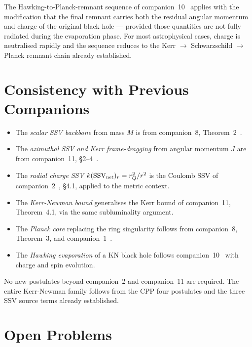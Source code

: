 \documentclass[12pt]{article}
\newcommand{\rQ}{r_Q}
\newcommand{\SSV}{\mathrm{SSV}}
\begin{document}
The Hawking-to-Planck-remnant sequence of companion~10~\cite{c10}
applies with the modification that the final remnant carries both the
residual angular momentum and charge of the original black hole —
provided those quantities are not fully radiated during the evaporation
phase.  For most astrophysical cases, charge is neutralised rapidly
and the sequence reduces to the Kerr $\to$ Schwarzschild $\to$ Planck
remnant chain already established.

\section{Consistency with Previous Companions}
\label{sec:consistency}

\begin{itemize}[noitemsep]
  \item The \emph{scalar SSV backbone} from mass $M$ is from companion~8,
    Theorem~2~\cite{c8}.
  \item The \emph{azimuthal SSV and Kerr frame-dragging} from angular
    momentum $J$ are from companion~11, §2--4~\cite{c11}.
  \item The \emph{radial charge SSV} $k(\SSV_{\rm net})_r = \rQ^2/r^2$
    is the Coulomb SSV of companion~2~\cite{c2}, §4.1, applied to the
    metric context.
  \item The \emph{Kerr-Newman bound} generalises the Kerr bound of
    companion~11, Theorem~4.1, via the same subluminality argument.
  \item The \emph{Planck core} replacing the ring singularity follows
    from companion~8, Theorem~3, and companion~1~\cite{c1}.
  \item The \emph{Hawking evaporation} of a KN black hole follows
    companion~10~\cite{c10} with charge and spin evolution.
\end{itemize}

No new postulates beyond companion~2 and companion~11 are required.
The entire Kerr-Newman family follows from the CPP four postulates
and the three SSV source terms already established.

\section{Open Problems}
\label{sec:open}
\end{document}
